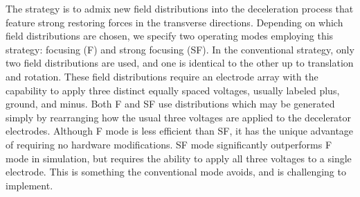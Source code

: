 \documentclass[%
 reprint,
 amsmath,amssymb,
 aps,
prl,
]{revtex4-1}
\begin{document}
The strategy is to admix new field distributions into the deceleration process that feature strong restoring forces in the transverse directions.
Depending on which field distributions are chosen, we specify two operating modes employing this strategy: focusing (F) and strong focusing (SF).
In the conventional strategy, only two field distributions are used, and one is identical to the other up to translation and rotation.
These field distributions require an electrode array with the capability to apply three distinct equally spaced voltages, usually labeled plus, ground, and minus.
Both F and SF use distributions which may be generated simply by rearranging how the usual three voltages are applied to the decelerator electrodes.
Although F mode is less efficient than SF, it has the unique advantage of requiring no hardware modifications.
SF mode significantly outperforms F mode in simulation, but requires the ability to apply all three voltages to a single electrode.
This is something the conventional mode avoids, and is challenging to implement.
\end{document}
